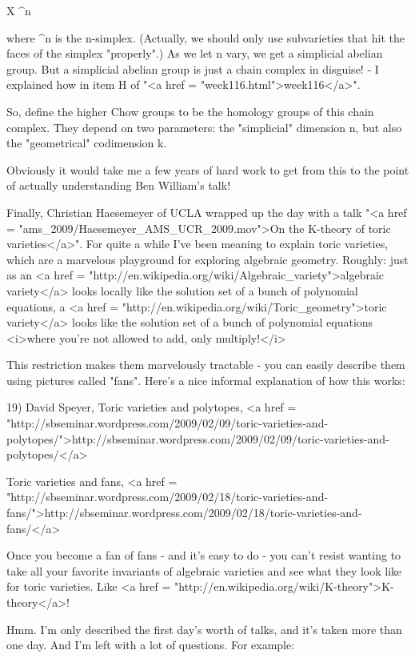 X \times  \Delta ^{n}

where \Delta ^{n} is the n-simplex.  (Actually, we should
only use subvarieties that hit the faces of the simplex
"properly".)  As we let n vary, we get a simplicial abelian
group.  But a simplicial abelian group is just a chain complex in
disguise! - I explained how in item H of "<a href =
"week116.html">week116</a>".

So, define the higher Chow groups to be the homology groups of this
chain complex.  They depend on two parameters: the
"simplicial" dimension n, but also the
"geometrical" codimension k.

Obviously it would take me a few years of hard work to get from
this to the point of actually understanding Ben William's talk!  

Finally, Christian Haesemeyer of UCLA wrapped up the day with a talk
"<a href = "ams_2009/Haesemeyer_AMS_UCR_2009.mov">On the K-theory
of toric varieties</a>".  For quite a while I've been meaning to
explain toric varieties, which are a marvelous playground for
exploring algebraic geometry.  Roughly: just as an <a href =
"http://en.wikipedia.org/wiki/Algebraic_variety">algebraic variety</a>
looks locally like the solution set of a bunch of polynomial
equations, a <a href =
"http://en.wikipedia.org/wiki/Toric_geometry">toric variety</a> looks
like the solution set of a bunch of polynomial equations <i>where
you're not allowed to add, only multiply!</i>

This restriction makes them marvelously tractable - you can easily
describe them using pictures called "fans".  Here's a nice 
informal explanation of how this works:

19) David Speyer, Toric varieties and polytopes, 
<a href = "http://sbseminar.wordpress.com/2009/02/09/toric-varieties-and-polytopes/">http://sbseminar.wordpress.com/2009/02/09/toric-varieties-and-polytopes/</a>

Toric varieties and fans, 
<a href = "http://sbseminar.wordpress.com/2009/02/18/toric-varieties-and-fans/">http://sbseminar.wordpress.com/2009/02/18/toric-varieties-and-fans/</a>

Once you become a fan of fans - and it's easy to do - you can't
resist wanting to take all your favorite invariants of algebraic
varieties and see what they look like for toric varieties.  Like
<a href = "http://en.wikipedia.org/wiki/K-theory">K-theory</a>!

Hmm.  I'm only described the first day's worth of talks, and it's
taken more than one day.  And I'm left with a lot of questions.
For example:

